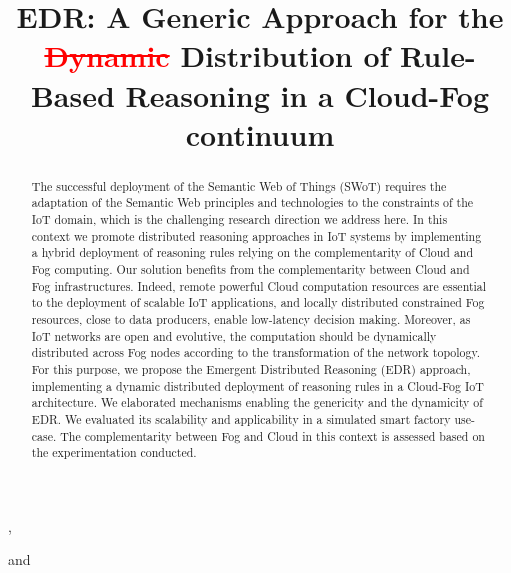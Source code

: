 \documentclass{iosart2c}
\newcommand{\removed}[1]{\textcolor{red}{\sout{#1}}}
\begin{document}
\begin{frontmatter}                           
	
\title{EDR: A Generic Approach for the \removed{Dynamic} Distribution of Rule-Based Reasoning in a Cloud-Fog continuum}



\author[A,B]{ },
\author[B]{ }
\author[A]{ }
and
\author[B]{ }
\address[A]{IRIT,\\Maison de la Recherche, Univ. Toulouse Jean Jaurès,\\5 allées Antonio Machado, F-31000 Toulouse\\email: \{name.surname\}@irit.fr}
\address[B]{LAAS-CNRS,\\ Université de Toulouse, CNRS, INSA, Toulouse, France\\email: \{name.surname\}@laas.fr}



\begin{abstract}
The successful deployment of the Semantic Web of Things (SWoT) requires the adaptation of the Semantic Web principles and technologies to the constraints of the IoT domain, which is the challenging research direction we address here. 
In this context we promote distributed reasoning approaches in IoT systems by implementing a hybrid deployment of reasoning rules relying on the complementarity of Cloud and Fog computing.  
Our solution benefits from the complementarity between Cloud and Fog infrastructures. 
Indeed, remote powerful Cloud computation resources are essential to the deployment of scalable IoT applications, and locally distributed constrained Fog resources, close to data producers, enable low-latency decision making.
Moreover, as IoT networks are open and evolutive, the computation should be dynamically distributed across Fog nodes according to the transformation of the network topology.
For this purpose, we propose the Emergent Distributed Reasoning (EDR) approach, implementing a dynamic distributed deployment of reasoning rules in a Cloud-Fog IoT architecture.
We elaborated mechanisms enabling the genericity and the dynamicity of EDR.
We evaluated its scalability and applicability in a simulated smart factory use-case.
The complementarity between Fog and Cloud in this context is assessed based on the experimentation conducted.
\end{abstract}


\end{frontmatter}
\end{document}
